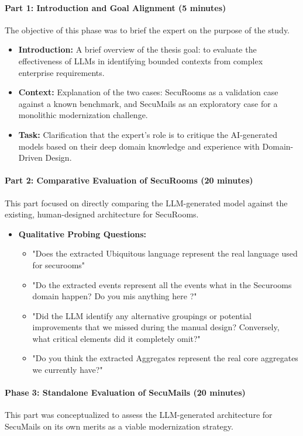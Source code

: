\paragraph{Part 1: Introduction and Goal Alignment (5 minutes)}
The objective of this phase was to brief the expert on the purpose of the study.
\begin{itemize}
    \item \textbf{Introduction:} A brief overview of the thesis goal: to evaluate the effectiveness of LLMs in identifying bounded contexts from complex enterprise requirements.
    \item \textbf{Context:} Explanation of the two cases: SecuRooms as a validation case against a known benchmark, and SecuMails as an exploratory case for a monolithic modernization challenge.
    \item \textbf{Task:} Clarification that the expert's role is to critique the AI-generated models based on their deep domain knowledge and experience with Domain-Driven Design.
\end{itemize}

\paragraph{Part 2: Comparative Evaluation of SecuRooms (20 minutes)}
This part focused on directly comparing the LLM-generated model against the existing, human-designed architecture for SecuRooms.

\begin{itemize}
    \item \textbf{Qualitative Probing Questions:}
    \begin{itemize}
        \item "Does the extracted Ubiquitous language represent the real language used for securooms"
        \item "Do the extracted events represent all the events what in the Securooms domain happen? Do you mis anything here ?"
        \item "Did the LLM identify any alternative groupings or potential improvements that we missed during the manual design? Conversely, what critical elements did it completely omit?"
        \item "Do you think the extracted Aggregates represent the real core aggregates we currently have?"
    \end{itemize}
\end{itemize}

\paragraph{Phase 3: Standalone Evaluation of SecuMails (20 minutes)}
This part was conceptualized to assess the LLM-generated architecture for SecuMails on its own merits as a viable modernization strategy.


